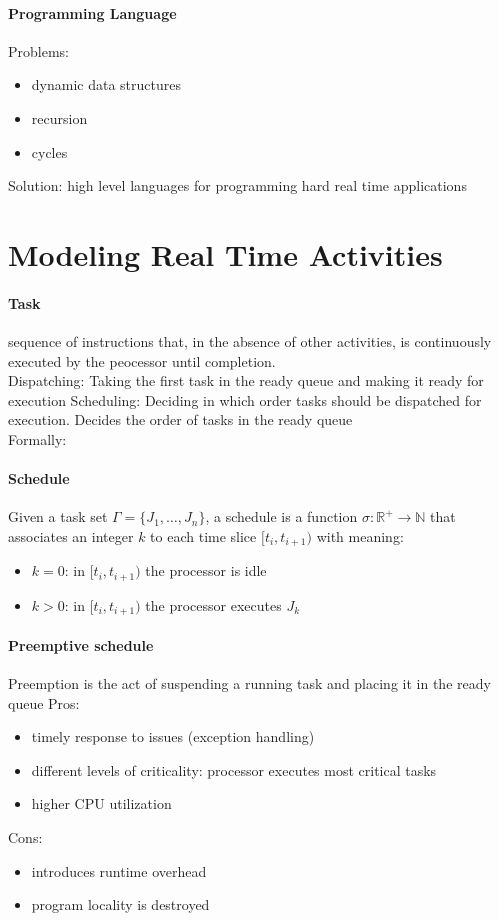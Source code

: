 \documentclass{book}
\begin{document}
\subsubsection{Programming Language}
Problems: \begin{itemize}
    \item dynamic data structures
    \item recursion
    \item cycles
\end{itemize} 
Solution: high level languages for programming hard real time applications

\chapter{Modeling Real Time Activities}
\subsubsection{Task}
 sequence of instructions that, in the absence of other activities, is continuously executed by the peocessor until completion.\\
Dispatching: Taking the first task in the ready queue and making it ready for execution
Scheduling: Deciding in which order tasks should be dispatched for execution. Decides the order of tasks in the ready queue
\\Formally: %
\subsubsection{Schedule}
Given a task set $\Gamma= \{J_1,\dots,J_n\}$, a schedule is a function $\sigma : \mathbb{R}^+ \to \mathbb{N}$ that associates an integer $k$ to each time slice $[t_i, t_{i+1} )$ with meaning: 
\begin{itemize}
    \item $k=0$: in $[t_i, t_{i+1} )$ the processor is idle
    \item $k>0$: in $[t_i, t_{i+1} )$ the processor executes $J_k$
\end{itemize}    

\subsubsection{Preemptive schedule}
Preemption is the act of suspending a running task and placing it in the ready queue
Pros:\begin{itemize}
    \item timely response to issues (exception handling)
    \item different levels of criticality: processor executes most critical tasks
    \item higher CPU utilization
\end{itemize}
Cons: \begin{itemize}
    \item introduces runtime overhead
    \item program locality is destroyed
\end{itemize}
\end{document}

